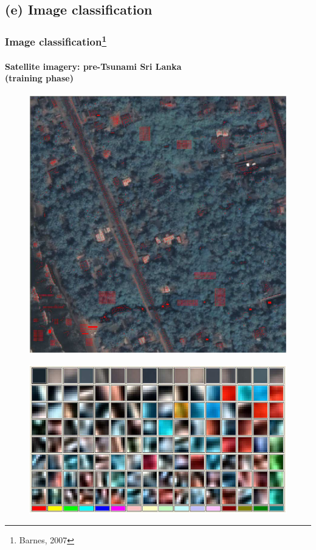 \subsection{(e) Image classification}
\begin{frame}
\frametitle{Image classification\footnote{Barnes, 2007}}
\framesubtitle{\small Satellite imagery: pre-Tsunami Sri Lanka \\(training phase)}
\mypagenum
	\begin{figure}		
		\includegraphics[height=0.3\textheight]{thesis/RVQ_SatelliteSriLanka_1_snippets.png}			
	\end{figure}
	\begin{figure}		
		\includegraphics[height=0.35\textheight]{thesis/RVQ_SatelliteSriLanka_2_codebooks.png}			
	\end{figure}
\end{frame}




